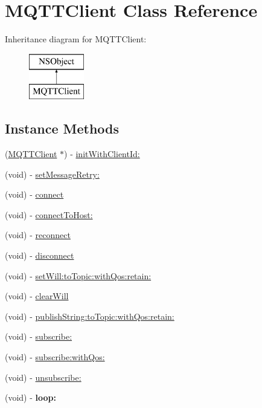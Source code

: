 \hypertarget{interface_m_q_t_t_client}{\section{M\-Q\-T\-T\-Client Class Reference}
\label{interface_m_q_t_t_client}
}
Inheritance diagram for M\-Q\-T\-T\-Client\-:\begin{figure}[H]
\begin{center}
\leavevmode
\includegraphics[height=2.000000cm]{interface_m_q_t_t_client}
\end{center}
\end{figure}
\subsection*{Instance Methods}
\begin{DoxyCompactItemize}
\item 
(\hyperlink{interface_m_q_t_t_client}{M\-Q\-T\-T\-Client} $\ast$) -\/ \hyperlink{interface_m_q_t_t_client_a2ca50eb85a638fe1dd3415eaa55b79eb}{init\-With\-Client\-Id\-:}
\item 
(void) -\/ \hyperlink{interface_m_q_t_t_client_afd942b93568e259fba6b22abec4bea59}{set\-Message\-Retry\-:}
\item 
(void) -\/ \hyperlink{interface_m_q_t_t_client_a209e35ab865030b42518b0f94713694a}{connect}
\item 
(void) -\/ \hyperlink{interface_m_q_t_t_client_affe3571b6b972fb3f41ceea7778de723}{connect\-To\-Host\-:}
\item 
(void) -\/ \hyperlink{interface_m_q_t_t_client_a8a2180a68956d6a897f068994e5c8864}{reconnect}
\item 
(void) -\/ \hyperlink{interface_m_q_t_t_client_a5da21136f56343f0db9dba70e0384ba9}{disconnect}
\item 
(void) -\/ \hyperlink{interface_m_q_t_t_client_a8af6c4267519439b5d0b2eb91bc0eb8d}{set\-Will\-:to\-Topic\-:with\-Qos\-:retain\-:}
\item 
(void) -\/ \hyperlink{interface_m_q_t_t_client_a70b2a3eb06df7dc5f12b550d4df3a28a}{clear\-Will}
\item 
(void) -\/ \hyperlink{interface_m_q_t_t_client_adad97fb0b40b931c232de1b691155fbd}{publish\-String\-:to\-Topic\-:with\-Qos\-:retain\-:}
\item 
(void) -\/ \hyperlink{interface_m_q_t_t_client_aa49277b1d3806e73cc16a1aa13a6ecfc}{subscribe\-:}
\item 
(void) -\/ \hyperlink{interface_m_q_t_t_client_a8d389ce309a69c1049caf92ed2c70e59}{subscribe\-:with\-Qos\-:}
\item 
(void) -\/ \hyperlink{interface_m_q_t_t_client_a712c2fe6afed9d57794c81b483238ecc}{unsubscribe\-:}
\item 
\hypertarget{interface_m_q_t_t_client_aa51b52a52ad834465ac4e0ae27997895}{(void) -\/ {\bfseries loop\-:}}\label{interface_m_q_t_t_client_aa51b52a52ad834465ac4e0ae27997895}

\end{DoxyCompactItemize}
